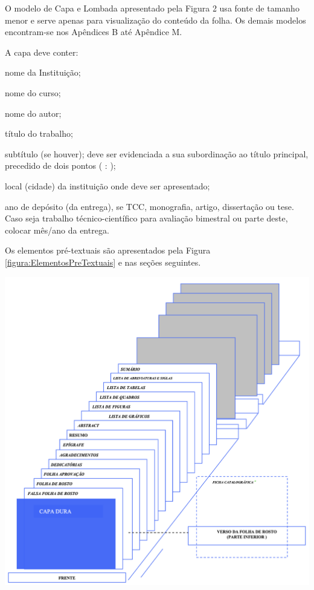 \documentclass[a4paper,12pt]{article}  %
\begin{document}
\begin{ElementosTextuais}
\begin{Desenvolvimento}
O modelo de Capa e Lombada apresentado pela Figura 2 usa fonte de tamanho menor e serve apenas para visualização do conteúdo da folha. Os demais modelos encontram-se nos Apêndices B até Apêndice M.

A capa deve conter:
\begin{alinea}
  \item nome da Instituição;
  \item nome do curso;
  \item nome do autor;
  \item título do trabalho;
  \item subtítulo (se houver); deve ser evidenciada a sua subordinação ao título principal, precedido de dois pontos ( : );
  \item local (cidade) da instituição onde deve ser apresentado;
  \item ano de depósito (da entrega), se TCC, monografia, artigo, dissertação ou tese. Caso seja trabalho técnico-científico para avaliação bimestral ou parte deste, colocar mês/ano da entrega.
\end{alinea}

Os elementos pré-textuais são apresentados pela Figura \ref{figura:ElementosPreTextuais} e nas seções seguintes.

\begin{figura}[h!]
  \centering
  \addfigura
  \includegraphics[width=1\textwidth]{ilustracoes/figuras/Elementos Pre Textuais.png}
  \label{figura:ElementosPreTextuais}
\end{figura}


\end{Desenvolvimento}
\end{ElementosTextuais}
\end{document}
